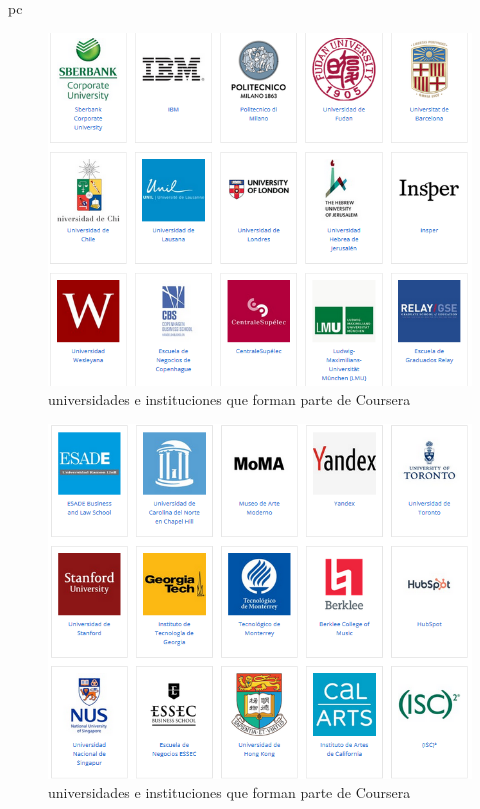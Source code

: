pc\documentclass[a4paper,12pt,openany]{book}
\begin{document}
\begin{figure}[H]
  \centering
	\includegraphics[width=12cm]{coursera10-5.png}
\caption{universidades e instituciones que forman parte de Coursera}
  \label{fig:cour10-5}
\end{figure}

\begin{figure}[H]
  \centering
	\includegraphics[width=12cm]{coursera10-6.png}
\caption{universidades e instituciones que forman parte de Coursera}
  \label{fig:cour10-6}
\end{figure}
\end{document}
